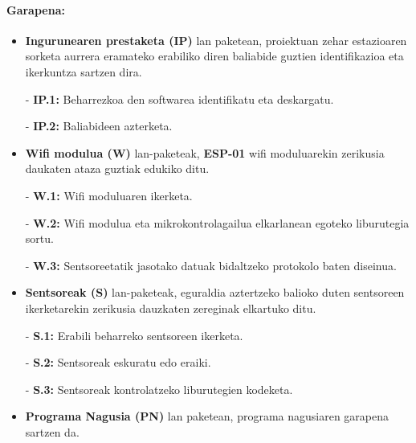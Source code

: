 \paragraph{\textbf{Garapena:}}
\begin{itemize}
    \item \textbf{Ingurunearen prestaketa (IP)} lan paketean, proiektuan zehar estazioaren sorketa aurrera eramateko erabiliko diren baliabide guztien identifikazioa eta ikerkuntza sartzen dira.
        
        - \textbf{IP.1:} Beharrezkoa den softwarea identifikatu eta deskargatu.
        
        - \textbf{IP.2:} Baliabideen azterketa.
        
    \item \textbf{Wifi modulua (W)} lan-paketeak, \textbf{ESP-01} wifi moduluarekin zerikusia daukaten ataza guztiak edukiko ditu. %
    
        - \textbf{W.1:} Wifi moduluaren ikerketa.
        
        - \textbf{W.2:} Wifi modulua eta mikrokontrolagailua elkarlanean egoteko liburutegia sortu.
        
        - \textbf{W.3:} Sentsoreetatik jasotako datuak bidaltzeko protokolo baten diseinua.
        
    \item \textbf{Sentsoreak (S)} lan-paketeak, eguraldia aztertzeko balioko duten sentsoreen ikerketarekin zerikusia dauzkaten zereginak elkartuko ditu.
    
        - \textbf{S.1:} Erabili beharreko sentsoreen ikerketa.
        
        - \textbf{S.2:} Sentsoreak eskuratu edo eraiki.
        
        - \textbf{S.3:} Sentsoreak kontrolatzeko liburutegien kodeketa.
        
    
    \item \textbf{Programa Nagusia (PN)} lan paketean, programa nagusiaren garapena sartzen da.
    

\end{itemize}
